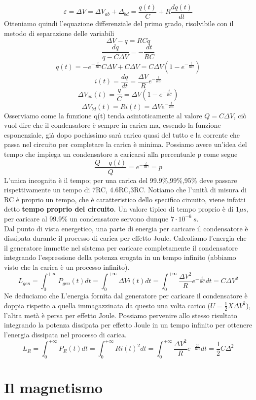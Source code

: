 \documentclass[10pt,a4paper]{article}
\begin{document}
\[\varepsilon = \Delta V = \Delta V_{ab} + \Delta_{bd} = \frac{q(t)}{C}+R\frac{dq(t)}{dt}\]
Otteniamo quindi l'equazione differenziale del primo grado, risolvibile con il metodo di separazione delle variabili
\[\Delta V-q = RC \dot{q}\]
\[\frac{dq}{q-C\Delta V}= -\frac{dt}{RC}\]
\[q(t) = -e^{-\frac{t}{RC}}C\Delta V+C\Delta V = C\Delta V(1-e^{-\frac{t}{RC}})\]
\[i(t) = \frac{dq}{dt} = \frac{\Delta V}{R}e^{-\frac{t}{RC}}\]
\[\Delta V_{ab}(t)=\frac{q}{C}= \Delta V(1-e^{-\frac{t}{RC}})\]
\[\Delta V_{bd}(t)=Ri(t)= \Delta Ve^{-\frac{t}{RC}}\]
Osserviamo come la funzione q(t) tenda asintoticamente al valore \(Q=C\Delta V \), ciò vuol dire che il condensatore è sempre in carica ma, essendo la funzione esponenziale, già dopo pochissimo sarà carico quasi del tutto e la corrente che passa nel circuito per completare la carica è minima. Possiamo avere un'idea del tempo che impiega un condensatore a caricarsi alla percentuale p come segue
\[\frac{Q-q(t)}{Q} = e^{-\frac{t}{RC}}=p\]
L'unica incognita è il tempo; per una carica del 99.9\%,99\%,95\% deve passare rispettivamente un tempo di 7RC, 4.6RC,3RC. Notiamo che l'unità di misura di RC è proprio un tempo, che è caratteristico dello specifico circuito, viene infatti detto \textbf{tempo proprio del circuito}. Un valore tipico di tempo proprio è di \(1\mu s \), per caricare al 99.9\% un condensatore servono dunque \(7\cdot10^{-6}\ s\). \\
Dal punto di vista energetico, una parte di energia per caricare il condensatore è dissipata durante il processo di carica per effetto Joule. Calcoliamo l'energia che il generatore immette nel sistema per caricare completamente il condensatore integrando l'espressione della potenza erogata in un tempo infinito (abbiamo visto che la carica è un processo infinito). 
\[L_{gen} = \int_{0}^{+\infty}P_{gen}(t)dt=\int_{0}^{+\infty}\Delta V i(t)dt = \int_{0}^{+\infty}\frac{\Delta V^2}{R} e^{-\frac{t}{RC}}dt = C\Delta V^2 \]
Ne deduciamo che L'energia fornita dal generatore per caricare il condensatore è doppia rispetto a quella immagazzinata da questo una volta carico (\(U=\frac{1}{2}X\Delta V^2\)), l'altra metà è persa per effetto Joule. Possiamo pervenire allo stesso risultato integrando la potenza dissipata per effetto Joule in un tempo infinito per ottenere l'energia dissipata nel processo di carica. 
\[L_{R} = \int_{0}^{+\infty}P_{R}(t)dt =\int_{0}^{+\infty}Ri(t)^2dt = \int_{0}^{+\infty}\frac{\Delta V^2}{R}e^{-\frac{2t}{RC}}dt = \frac{1}{2}C\Delta^2\]
\section{Il magnetismo}
\end{document}

